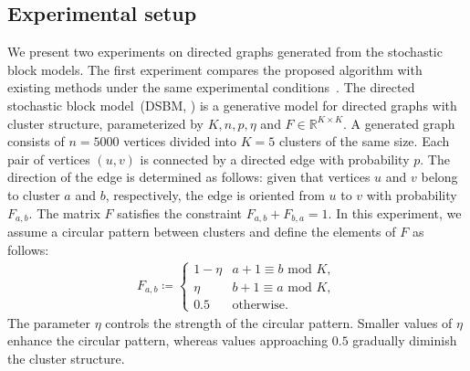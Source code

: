 \documentclass{article}
\theoremstyle{plain}
\begin{document}
\subsection{Experimental setup}

We present two experiments on directed graphs generated from the stochastic block models.
The first experiment compares the proposed algorithm with existing methods under the same experimental conditions~\citep{Cucuringu2020-de}.
The directed stochastic block model~(DSBM, \citep{Cucuringu2020-de}) is a generative model for directed graphs with cluster structure, parameterized by $K, n, p, \eta$ and $F \in \mathbb{R}^{K\times K}$. A generated graph consists of $n=5000$ vertices divided into $K=5$ clusters of the same size. Each pair of vertices $(u,v)$ is connected by a directed edge with probability $p$. The direction of the edge is determined as follows: given that vertices $u$ and $v$ belong to cluster $a$ and $b$, respectively, the edge is oriented from $u$ to $v$ with probability $F_{a,b}$. The matrix $F$ satisfies the constraint $F_{a,b} + F_{b,a} = 1$. In this experiment, we assume a circular pattern between clusters and define the elements of $F$ as follows:
\begin{align*}
	F_{a,b} \coloneqq \begin{cases}
		                  1 - \eta & a+1 \equiv b \text{ mod } K
		                  ,                                      \\
		                  \eta     & b+1 \equiv a \text{ mod } K
		                  ,                                      \\
		                  0.5      & \text{otherwise}
		                  .
	                  \end{cases}
\end{align*}
The parameter $\eta$ controls the strength of the circular pattern. Smaller values of $\eta$ enhance the circular pattern, whereas values approaching $0.5$ gradually diminish the cluster structure.
\end{document}
